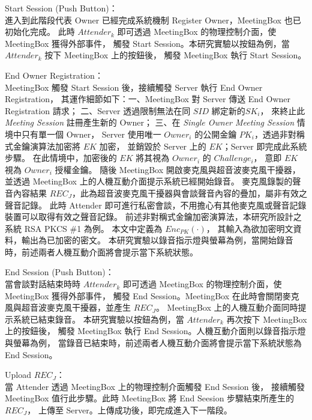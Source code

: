 \begin{steps}
    \item Start Session (Push Button)：\\
        進入到此階段代表 Owner 已經完成系統機制 Register Owner，MeetingBox 也已初始化完成。
        此時 $Attender_{k}$ 即可透過 MeetingBox 的物理控制介面，使 MeetingBox 獲得外部事件，
        觸發 Start Session。本研究實驗以按鈕為例，當 $Attender_{k}$ 按下 MeetingBox 上的按鈕後，
        觸發 MeetingBox 執行 Start Session。

    \item End Owner Registration：\\
        MeetingBox 觸發 Start Session 後，接續觸發 Server 執行 End Owner Registration，
        其運作細節如下：一、MeetingBox 對 Server 傳送 End Owner Registration 請求；
        二、Server 透過限制無法在同 $SID$ 綁定新的$SK_{i}$，
        來終止此 {\it Meeting Session} 註冊產生新的 Owner；
        三、在 {\it Single Owner Meeting Session} 情境中只有單一個 Owner，
        Server 使用唯一 $Owner_{i}$ 的公開金鑰 $PK_{i}$，透過非對稱式金鑰演算法加密將 $EK$ 加密，
        並銷毀於 Server 上的 $EK$；Server 即完成此系統步驟。
        在此情境中，加密後的 $EK$ 將其視為 $Owner_{i}$ 的 $Challenge_{i}$，
        意即 $EK$ 視為 $Owner_{i}$ 授權金鑰。
        隨後 MeetingBox 開啟麥克風與超音波麥克風干擾器，並透過 MeetingBox 上的人機互動介面提示系統已經開始錄音。
        麥克風錄製的聲音內容結果 $REC_{J}$，此為超音波麥克風干擾器與會談聲音內容的疊加，屬非有效之聲音記錄。
        此時 Attender 即可進行私密會談，不用擔心有其他麥克風或聲音記錄裝置可以取得有效之聲音記錄。
        前述非對稱式金鑰加密演算法，本研究所設計之系統 RSA PKCS \#1 為例。 本文中定義為 $Enc_{PK}(·)$，
        其輸入為欲加密明文資料，輸出為已加密的密文。
        本研究實驗以錄音指示燈與螢幕為例，當開始錄音時，前述兩者人機互動介面將會提示當下系統狀態。

    \item End Session (Push Button)：\\
        當會談對話結束時時 $Attender_{k}$ 即可透過 MeetingBox 的物理控制介面，使 MeetingBox 獲得外部事件，
        觸發 End Session。MeetingBox 在此時會關閉麥克風與超音波麥克風干擾器，並產生 $REC_{J}$。
        MeetingBox 上的人機互動介面同時提示系統已結束錄音。
        本研究實驗以按鈕為例，當 $Attender_{k}$ 再次按下 MeetingBox 上的按鈕後，
        觸發 MeetingBox 執行 End Session。人機互動介面則以錄音指示燈與螢幕為例，
        當錄音已結束時，前述兩者人機互動介面將會提示當下系統狀態為 End Session。

    \item Upload $REC_{J}$：\\
        當 Attender 透過 MeetingBox 上的物理控制介面觸發 End Session 後，
        接續觸發 MeetingBox 值行此步驟。此時 MeetingBox 將 End Seesion 步驟結束所產生的 $REC_{J}$，
        上傳至 Server。上傳成功後，即完成進入下一階段。
\end{steps}


